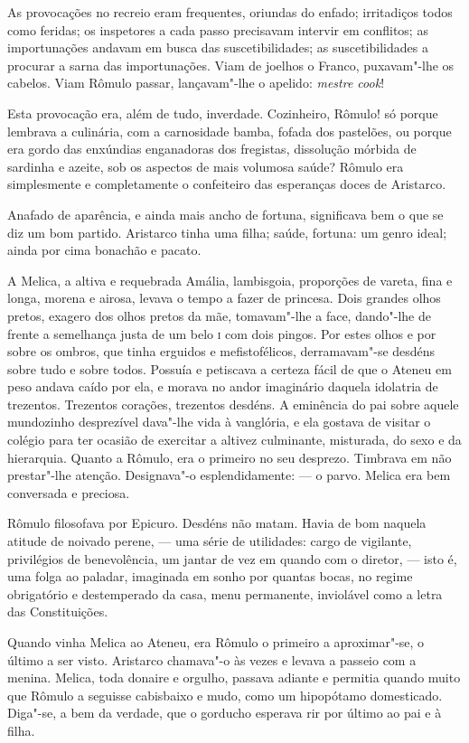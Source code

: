 As provocações no recreio eram frequentes, oriundas do
enfado; irritadiços todos como feridas; os inspetores a cada passo
precisavam intervir em conflitos; as importunações andavam em busca das
suscetibilidades; as suscetibilidades a procurar a sarna das
importunações. Viam de joelhos o Franco, puxavam"-lhe os cabelos. Viam
Rômulo passar, lançavam"-lhe o apelido: \textit{mestre cook}! 

Esta provocação
era, além de tudo, inverdade. Cozinheiro, Rômulo! só porque lembrava a
culinária, com a carnosidade bamba, fofada dos pastelões, ou porque era
gordo das enxúndias enganadoras dos fregistas, dissolução mórbida de
sardinha e azeite, sob os aspectos de mais volumosa saúde? Rômulo era
simplesmente e completamente o confeiteiro das esperanças doces de
Aristarco. 

Anafado de aparência, e ainda mais ancho de fortuna,
significava bem o que se diz um bom partido. Aristarco tinha uma filha;
saúde, fortuna: um genro ideal; ainda por cima bonachão e pacato. 

A Melica, a altiva e requebrada Amália, lambisgoia, proporções de vareta,
fina e longa, morena e airosa, levava o tempo a fazer de princesa. Dois
grandes olhos pretos, exagero dos olhos pretos da mãe, tomavam"-lhe a
face, dando"-lhe de frente a semelhança justa de um belo \textsc{i} com dois
pingos. Por estes olhos e por sobre os ombros, que tinha erguidos e
mefistofélicos, derramavam"-se desdéns sobre tudo e sobre todos.
Possuía e petiscava a certeza fácil de que o Ateneu em peso andava
caído por ela, e morava no andor imaginário daquela idolatria de trezentos. 
Trezentos corações, trezentos desdéns. A eminência do pai sobre aquele mundozinho
desprezível dava"-lhe vida à vanglória, e ela gostava de visitar o
colégio para ter ocasião de exercitar a altivez culminante, misturada,
do sexo e da hierarquia. Quanto a Rômulo, era o primeiro no seu
desprezo. Timbrava em não prestar"-lhe atenção. Designava"-o
esplendidamente: --- o parvo. Melica era bem conversada e preciosa.

Rômulo filosofava por Epicuro. Desdéns não matam. Havia de bom naquela
atitude de noivado perene, --- uma série de utilidades: cargo de
vigilante, privilégios de benevolência, um jantar de vez em quando com
o diretor, --- isto é, uma folga ao paladar, imaginada em sonho por
quantas bocas, no regime obrigatório e destemperado da casa, menu
permanente, inviolável como a letra das Constituições. 

Quando vinha Melica ao Ateneu, era Rômulo o primeiro a aproximar"-se, 
o último a ser visto. Aristarco chamava"-o às vezes e levava a passeio com a
menina. Melica, toda donaire e orgulho, passava adiante e permitia
quando muito que Rômulo a seguisse cabisbaixo e mudo, como um
hipopótamo domesticado. Diga"-se, a bem da verdade, que o gorducho
esperava rir por último ao pai e à filha. 

